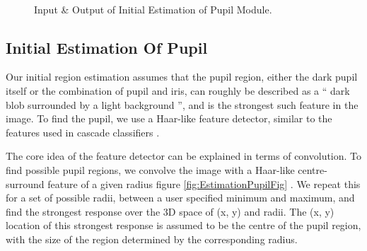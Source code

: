 \documentclass[12pt,fleqn]{book} %
\begin{document}
\begin{figure}[]
\begin{dBox}
\centering
  \mbox{
   }
   
   \caption{Input \& Output of Initial Estimation of Pupil Module. \label{fig:Initial_Estimation_Of_Pupil} }   
\end{dBox}   
\end{figure}

\subsection{Initial Estimation Of Pupil} 
Our initial region estimation assumes that the pupil region, either the dark pupil itself or the combination of pupil and iris, can roughly be described as a “ dark blob surrounded by a light background ”, and is the strongest such feature in the image. To find the pupil, we use a Haar-like feature detector, similar to the features used in cascade classifiers \cite{ViolaAndJones2001}. \bigskip

The core idea of the feature detector can be explained in terms of convolution. To find possible pupil regions, we convolve the image with a Haar-like centre-surround feature of a given radius figure \ref{fig:EstimationPupilFig} . We repeat this for a set of possible radii, between a user specified minimum and maximum, and find the strongest response over the 3D space of (x, y) and radii. The (x, y) location of this strongest response is assumed to be the centre of the pupil region, with the size of the region determined by the corresponding radius. \bigskip
\end{document}
